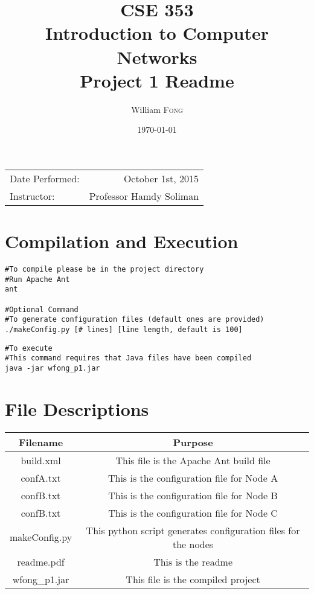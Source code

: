 \documentclass{article}
\title{CSE 353 \\ Introduction to Computer Networks \\ Project 1 Readme} %
\author{William \textsc{Fong}} %
\date{\today} %
\begin{document}
\maketitle %

\begin{center}
\begin{tabular}{l r}
Date Performed: & October 1st, 2015 \\ %
Instructor: & Professor Hamdy Soliman %
\end{tabular}
\end{center}



\section{Compilation and Execution}
\begin{lstlisting}
#To compile please be in the project directory
#Run Apache Ant
ant

#Optional Command
#To generate configuration files (default ones are provided)
./makeConfig.py [# lines] [line length, default is 100]
\end{lstlisting}

\begin{lstlisting}
#To execute
#This command requires that Java files have been compiled
java -jar wfong_p1.jar
\end{lstlisting}

\section{File Descriptions}

\begin{tabular}{|c|c|}
\hline
Filename & Purpose\\
\hline \hline
build.xml & This file is the Apache Ant build file\\
\hline
confA.txt & This is the configuration file for Node A\\
\hline
confB.txt & This is the configuration file for Node B\\
\hline
confB.txt & This is the configuration file for Node C\\
\hline
makeConfig.py & This python script generates configuration files for the nodes\\
\hline
readme.pdf & This is the readme\\
\hline
wfong\_p1.jar & This file is the compiled project\\
\hline
\end{tabular}
\end{document}
